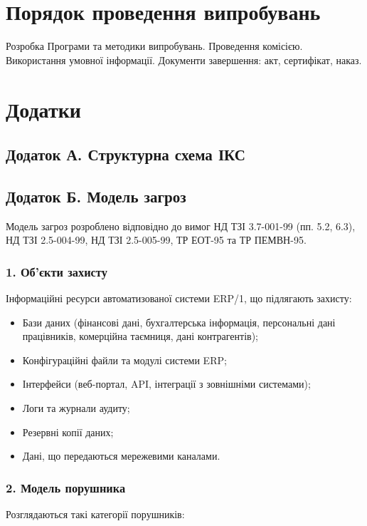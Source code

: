 \documentclass{article}
\begin{document}
\section{Порядок проведення випробувань}
Розробка Програми та методики випробувань. Проведення комісією. Використання умовної інформації. Документи завершення: акт, сертифікат, наказ.

\newpage
\section{Додатки}

\subsection{Додаток А. Структурна схема ІКС}

\subsection{Додаток Б. Модель загроз}

Модель загроз розроблено відповідно до вимог НД ТЗІ 3.7-001-99 (пп. 5.2, 6.3), НД ТЗІ 2.5-004-99, НД ТЗІ 2.5-005-99, ТР ЕОТ-95 та ТР ПЕМВН-95.

\subsubsection{1. Об'єкти захисту}
Інформаційні ресурси автоматизованої системи ERP/1, що підлягають захисту:
\begin{itemize}
    \item Бази даних (фінансові дані, бухгалтерська інформація, персональні дані працівників, комерційна таємниця, дані контрагентів);
    \item Конфігураційні файли та модулі системи ERP;
    \item Інтерфейси (веб-портал, API, інтеграції з зовнішніми системами);
    \item Логи та журнали аудиту;
    \item Резервні копії даних;
    \item Дані, що передаються мережевими каналами.
\end{itemize}

\subsubsection{2. Модель порушника}
Розглядаються такі категорії порушників:
\end{document}
